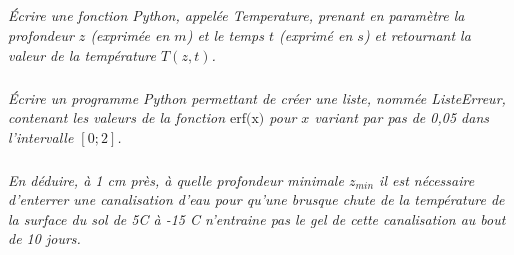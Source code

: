 \documentclass[10pt,oneside]{article}
\begin{document}
\subparagraph{}
\textit{Écrire une fonction Python, appelée \textsf{Temperature}, prenant en paramètre la profondeur $z$ (exprimée
en $m$) et le temps $t$ (exprimé en $s$) et retournant la valeur de la température $T(z, t)$.}

\subparagraph{}
\textit{Écrire un programme Python permettant de créer une liste, nommée \textsf{ListeErreur}, contenant les
valeurs de la fonction $\text{erf(x)}$ pour $x$ variant par pas de 0,05 dans l’intervalle $[0 ; 2]$.}

\subparagraph{}
\textit{En déduire, à 1 cm près, à quelle profondeur minimale $z_{min}$ il est nécessaire d’enterrer une
canalisation d’eau pour qu’une brusque chute de la température de la surface du sol de 5\textdegree C à -15 \textdegree C
n’entraine pas le gel de cette canalisation au bout de 10 jours.}
\end{document}
